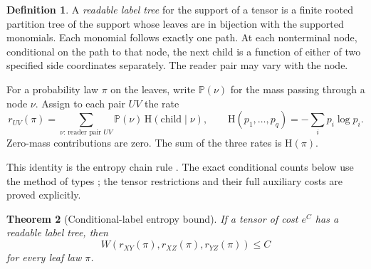 \documentclass[11pt]{article}
\numberwithin{equation}{section}
\newtheorem{theorem}{Theorem}[section]
\theoremstyle{definition}
\newtheorem{definition}[theorem]{Definition}
\theoremstyle{remark}
\newcommand{\HH}{\mathrm H}
\newcommand{\Prb}{\mathbb P}
\begin{document}
\begin{definition}\label{def:label-tree}
A \emph{readable label tree} for the support of a tensor is a finite
rooted partition tree of the support whose leaves are in bijection
with the supported monomials.  Each monomial follows exactly one path.
At each nonterminal node, conditional on the path to that node, the
next child is a function of either of two specified side coordinates
separately.
The reader pair may vary with the node.
\end{definition}

For a probability law \(\pi\) on the leaves, write \(\Prb(\nu)\) for
the mass passing through a node \(\nu\).
Assign to each pair \(UV\) the rate
\[
 r_{UV}(\pi)=
 \sum_{\nu:\,\text{reader pair }UV}
 \Prb(\nu)\,\HH(\text{child}\mid\nu),
 \qquad
 \HH(p_1,\ldots,p_q)=-\sum_i p_i\log p_i.
\]
Zero-mass contributions are zero.
The sum of the three rates is \(\HH(\pi)\).

This identity is the entropy chain rule \cite[Section~6]{shannon1948}.
The exact conditional counts below use the method of types
\cite[Section~II]{csiszar1998}; the tensor restrictions and their full
auxiliary costs are proved explicitly.

\begin{theorem}[Conditional-label entropy bound]\label{thm:entropy}
If a tensor of cost \(e^C\) has a readable label tree, then
\begin{equation}\label{eq:entropy-bound}
 W(r_{XY}(\pi),r_{XZ}(\pi),r_{YZ}(\pi))\le C
\end{equation}
for every leaf law \(\pi\).
\end{theorem}
\end{document}
